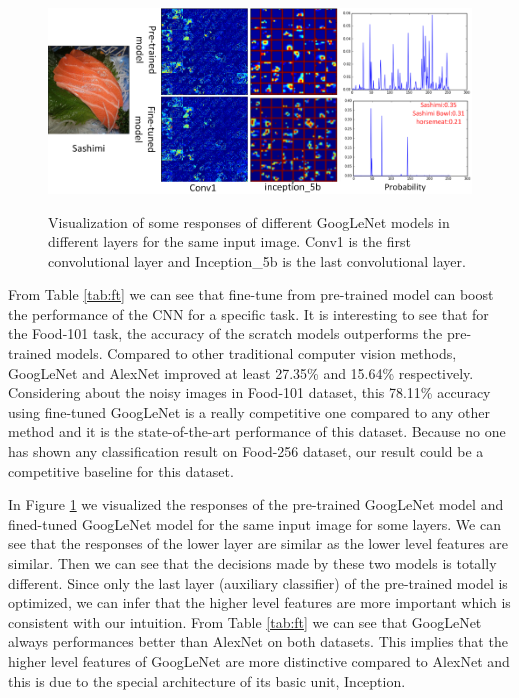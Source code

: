 \begin{figure}[htbp]
  \centering
  \includegraphics[scale=0.5]{fig/sashimi.png}\\
  \caption{Visualization of some responses of different GoogLeNet models in different layers for the same input image. Conv1 is the first convolutional layer and Inception\_5b is the last convolutional layer. }
   \label{fig:sashimi}
\end{figure}
From Table \ref{tab:ft} we can see that fine-tune from pre-trained model can boost the performance of the CNN for a specific task. It is interesting to see that for the Food-101 task, the accuracy of  the scratch models outperforms the pre-trained models. Compared to other traditional computer vision methods, GoogLeNet and AlexNet improved at least 27.35\% and 15.64\% respectively. Considering about the noisy images in Food-101 dataset, this 78.11\% accuracy using fine-tuned GoogLeNet is a really competitive one compared to any other method and it is the state-of-the-art performance of this dataset. Because no one has shown any classification result on Food-256 dataset, our result could be a competitive baseline for this dataset.

In Figure \ref{fig:sashimi} we visualized the responses of the pre-trained GoogLeNet model and fined-tuned GoogLeNet model for the same input image for some layers. We can see that the responses of the lower layer are similar as the lower level features are similar. Then we can see that the decisions made by these two models is totally different. Since only the last layer (auxiliary classifier) of the pre-trained model is optimized, we can infer that the higher level features are more important which is consistent with our intuition. From Table \ref{tab:ft} we can see that GoogLeNet always performances better than AlexNet on both datasets. This implies that the higher level features of GoogLeNet are more distinctive compared to AlexNet and this is due to the special architecture of its basic unit, Inception.

